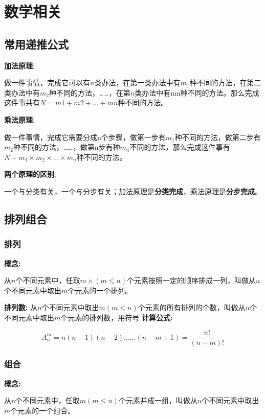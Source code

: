 \section{数学相关}

\subsection{常用递推公式}

\textbf{加法原理}:

做一件事情，完成它可以有$n$类办法，在第一类办法中有$m_1$种不同的方法，在第二类办法中有$m_2$种不同的方法，……，在第$n$类办法中有mn种不同的方法。那么完成这件事共有$N=m1+m2+…+mn$种不同的方法。

\textbf{乘法原理}:

做一件事情，完成它需要分成n个步骤，做第一步有$m_1$种不同的方法，做第二步有$m_2$种不同的方法，……，做第n步有种$m_n$不同的方法，那么完成这件事有$N+m_1 \times m_2 \times … \times m_n$种不同的方法。

\textbf{两个原理的区别}:

一个与分类有关，一个与分步有关；加法原理是\textbf{分类完成}，乘法原理是\textbf{分步完成}。

\subsection{排列组合}

\subsubsection{排列}

\textbf{概念:}


从$n$个不同元素中，任取$m\times(m \leqslant n)$个元素按照一定的顺序排成一列，叫做从$n$个不同元素中取出$m$个元素的一个排列。

\textbf{排列数:}
从$n$个不同元素中取出$m(m\leqslant n)$个元素的所有排列的个数，叫做从$n$个不同元素中取出$m$个元素的排列数，用符号
\textbf{计算公式:}

$$A_n^m=n(n-1)(n-2)......(n-m+1)=\frac{n!}{(n-m)!}$$


\subsubsection{组合}

\textbf{概念:}

从n个不同元素中，任取$m(m\leqslant n)$个元素并成一组，叫做从$n$个不同元素中取出$m$个元素的一个组合。

